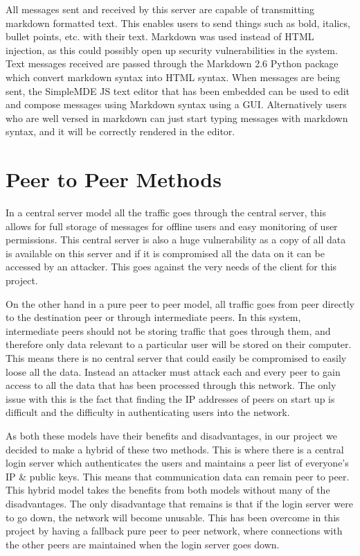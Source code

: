 \documentclass[a4paper,10pt,twoside]{article}
\begin{document}
All messages sent and received by this server are capable of transmitting markdown formatted text. This enables users to send things such as bold, italics, bullet points, etc. with their text. Markdown was used instead of HTML injection, as this could possibly open up security vulnerabilities in the system. Text messages received are passed through the Markdown 2.6 Python package which convert markdown syntax into HTML syntax. When messages are being sent, the SimpleMDE JS text editor that has been embedded can be used to edit and compose messages using Markdown syntax using a GUI. Alternatively users who are well versed in markdown can just start typing messages with markdown syntax, and it will be correctly rendered in the editor.

\section{Peer to Peer Methods}

In a central server model all the traffic goes through the central server, this allows for full storage of messages for offline users and easy monitoring of user permissions. This central server is also a huge vulnerability as a copy of all data is available on this server and if it is compromised all the data on it can be accessed by an attacker. This goes against the very needs of the client for this project.

On the other hand in a pure peer to peer model, all traffic goes from peer directly to the destination peer or through intermediate peers. In this system, intermediate peers should not be storing traffic that goes through them, and therefore only data relevant to a particular user will be stored on their computer. This means there is no central server that could easily be compromised to easily loose all the data. Instead an attacker must attack each and every peer to gain access to all the data that has been processed through this network. The only issue with this is the fact that finding the IP addresses of peers on start up is difficult and the difficulty in authenticating users into the network.

As both these models have their benefits and disadvantages, in our project we decided to make a hybrid of these two methods. This is where there is a central login server which authenticates the users and maintains a peer list of everyone's IP \& public keys. This means that communication data can remain peer to peer. This hybrid model takes the benefits from both models without many of the disadvantages. The only disadvantage that remains is that if the login server were to go down, the network will become unusable. This has been overcome in this project by having a fallback pure peer to peer network, where connections with the other peers are maintained when the login server goes down.
\end{document}
